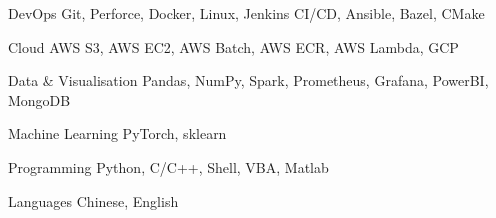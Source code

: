 

\begin{cvskills}

  \cvskill
    {DevOps} %
    {Git, Perforce, Docker, Linux, Jenkins CI/CD, Ansible, Bazel, CMake} %

  \cvskill
    {Cloud} %
    {AWS S3, AWS EC2, AWS Batch, AWS ECR, AWS Lambda, GCP} %

  \cvskill
    {Data \& Visualisation} %
    {Pandas, NumPy, Spark, Prometheus, Grafana, PowerBI, MongoDB} %

  \cvskill
    {Machine Learning}
    {PyTorch, sklearn}

  \cvskill
    {Programming} %
    {Python, C/C++, Shell, VBA, Matlab} %

  \cvskill
    {Languages} %
    {Chinese, English} %

\end{cvskills}
